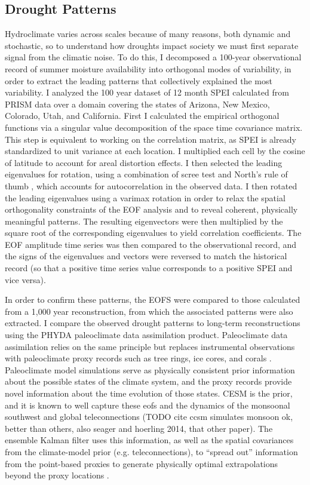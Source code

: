 \documentclass[10pt]{iopart}
\begin{document}
\subsection*{Drought Patterns}
Hydroclimate varies across scales because of many reasons, both dynamic and stochastic, so to understand how droughts impact society we must first separate signal from the climatic noise. To do this, I decomposed a 100-year observational record of summer moisture availability into orthogonal modes of variability, in order to extract the leading patterns that collectively explained the most variability. I analyzed the 100 year dataset of 12 month SPEI calculated from PRISM data over a domain covering the states of Arizona, New Mexico, Colorado, Utah, and California. First I calculated the empirical orthogonal functions via a singular value decomposition of the space time covariance matrix. This step is equivalent to working on the correlation matrix, as SPEI is already standardized to unit variance at each location. I multiplied each cell by the cosine of latitude to account for areal distortion effects. I then selected the leading eigenvalues for rotation, using a combination of scree test and North's rule of thumb \parencite{North1982}, which accounts for autocorrelation in the observed data. I then rotated the leading eigenvalues using a varimax rotation in order to relax the spatial orthogonality constraints of the EOF analysis and to reveal coherent, physically meaningful patterns. The resulting eigenvectors were then multiplied by the square root of the corresponding eigenvalues to yield correlation coefficients. The EOF amplitude time series was then compared to the observational record, and the signs of the eigenvalues and vectors were reversed to match the historical record (so that a positive time series value corresponds to a positive SPEI and vice versa).

In order to confirm these patterns, the EOFS were compared to those calculated from a 1,000 year reconstruction, from which the associated patterns were also extracted. I compare the observed drought patterns to long-term reconstructions using the PHYDA paleoclimate data assimilation product. Paleoclimate data assimilation relies on the same principle but replaces instrumental observations with paleoclimate proxy records such as tree rings, ice cores, and corals \parencite{Hakim2016TheResults}. Paleoclimate model simulations serve as physically consistent prior information about the possible states of the climate system, and the proxy records provide novel information about the time evolution of those states. CESM is the prior, and it is known to well capture these eofs and the dynamics of the monsoonal southwest and global teleconnections (TODO cite ccsm simulates monsoon ok, better than others, also seager and hoerling 2014, that other paper). The ensemble Kalman filter uses this information, as well as the spatial covariances from the climate-model prior (e.g. teleconnections), to ``spread out'' information from the point-based proxies to generate physically optimal extrapolations beyond the proxy locations \parencite{Acevedo2015TowardsTechniques,Hakim2016TheResults}.
\end{document}

